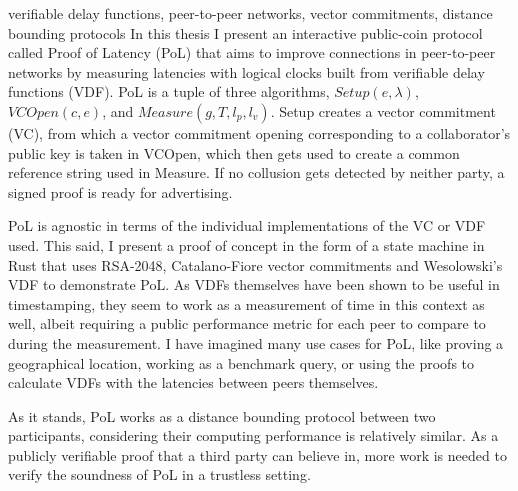 \begin{itabstract}{verifiable delay functions, peer-to-peer networks, vector commitments, distance bounding protocols}
	In this thesis I present an interactive public-coin protocol called Proof of Latency (PoL) that aims to improve connections in peer-to-peer networks by measuring latencies with logical clocks built from verifiable delay functions (VDF). PoL is a tuple of three algorithms, \(Setup(e, \lambda)\), \(VCOpen(c, e)\), and \(Measure(g, T, l_p, l_v)\). Setup creates a vector commitment (VC), from which a vector commitment opening corresponding to a collaborator's public key is taken in VCOpen, which then gets used to create a common reference string used in Measure. If no collusion gets detected by neither party, a signed proof is ready for advertising.

	PoL is agnostic in terms of the individual implementations of the VC or VDF used. This said, I present a proof of concept in the form of a state machine in Rust that uses RSA-2048, Catalano-Fiore vector commitments and Wesolowski's VDF to demonstrate PoL.
	As VDFs themselves have been shown to be useful in timestamping, they seem to work as a measurement of time in this context as well, albeit requiring a public performance metric for each peer to compare to during the measurement. I have imagined many use cases for PoL, like proving a geographical location, working as a benchmark query, or using the proofs to calculate VDFs with the latencies between peers themselves.

	As it stands, PoL works as a distance bounding protocol between two participants, considering their computing performance is relatively similar. As a publicly verifiable proof that a third party can believe in, more work is needed to verify the soundness of PoL in a trustless setting.
\end{itabstract}
